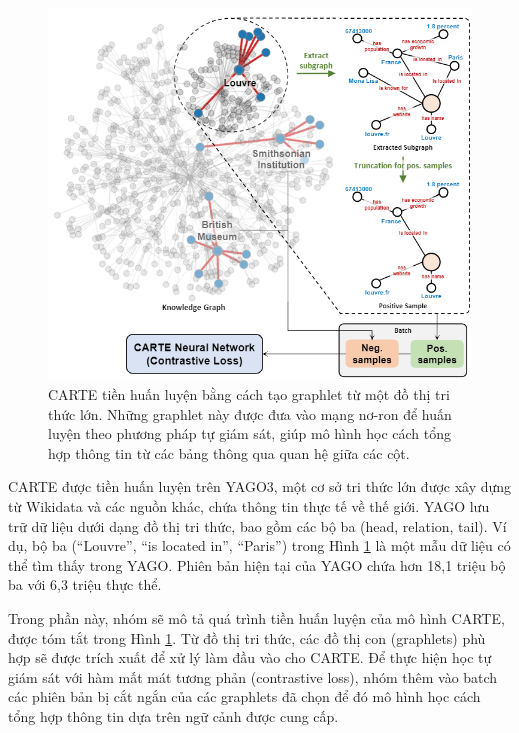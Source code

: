 \documentclass{article}
\begin{document}
\begin{figure} 
    \centering
    \includegraphics[scale = 0.8]{carte_pretraining_process.png}
    \caption{CARTE tiền huấn luyện bằng cách tạo graphlet từ một đồ thị tri thức lớn. Những graphlet này được đưa vào mạng nơ-ron để huấn luyện theo phương pháp tự giám sát, giúp mô hình học cách tổng hợp thông tin từ các bảng thông qua quan hệ giữa các cột.}
    \label{fig:carte_pretraining_process}
\end{figure}

CARTE được tiền huấn luyện trên YAGO3, một cơ sở tri thức lớn được xây dựng từ Wikidata và các nguồn khác, chứa thông tin thực tế về thế giới. YAGO lưu trữ dữ liệu dưới dạng đồ thị tri thức, bao gồm các bộ ba (head, relation, tail). Ví dụ, bộ ba (“Louvre”, “is located in”, “Paris”) trong Hình \ref{fig:carte_pretraining_process} là một mẫu dữ liệu có thể tìm thấy trong YAGO. Phiên bản hiện tại của YAGO chứa hơn 18,1 triệu bộ ba với 6,3 triệu thực thể.

Trong phần này, nhóm sẽ mô tả quá trình tiền huấn luyện của mô hình CARTE, được tóm tắt trong Hình \ref{fig:carte_pretraining_process}. Từ đồ thị tri thức, các đồ thị con (graphlets) phù hợp sẽ được trích xuất để xử lý làm đầu vào cho CARTE. Để thực hiện học tự giám sát với hàm mất mát tương phản (contrastive loss), nhóm thêm vào batch các phiên bản bị cắt ngắn của các graphlets đã chọn để đó mô hình học cách tổng hợp thông tin dựa trên ngữ cảnh được cung cấp.
\end{document}

